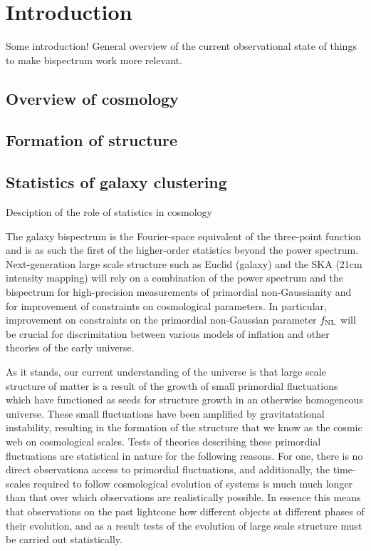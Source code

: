 \chapter{Introduction}
\label{chapter:introgen}

Some introduction! General overview of the current observational state of things to make bispectrum work more relevant.

\section{Overview of cosmology}

\section{Formation of structure}

\section{Statistics of galaxy clustering}
\label{chapter:introbisp}

Desciption of the role of statistics in cosmology

The galaxy bispectrum is the Fourier-space equivalent of the three-point function and is as such the first of the higher-order statistics beyond the power spectrum. Next-generation large scale structure such as Euclid (galaxy) and the SKA (21cm intensity mapping) will rely on a combination of the power spectrum and the bispectrum for high-precision measurements of primordial non-Gaussianity and for improvement of constraints on cosmological parameters. In particular, improvement on constraints on the primordial non-Gaussian parameter $f_\text{NL}$ will be crucial for discrimitation between various models of inflation and other theories of the early universe. 

As it stands, our current understanding of the universe is that large scale structure of matter is a result of the growth of small primordial fluctuations which have functioned as seeds for structure growth in an otherwise homogeneous universe. These small fluctuations have been amplified by gravitatational instability, resulting in the formation of the structure that we know as the cosmic web on cosmological scales. Tests of theories describing these primordial fluctuations are statistical in nature for the following reasons. For one, there is no direct observationa access to primordial fluctuations, and additionally, the time-scales required to follow cosmological evolution of systems is much much longer than that over which observations are realistically possible. In essence this means that observations on the past lightcone how different objects at different phases of their evolution, and as a result tests of the evolution of large scale structure must be carried out statistically. 

